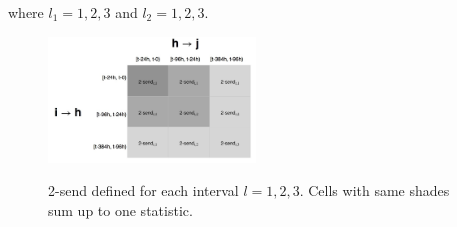 \documentclass{article}
\begin{document}
 where $l_1=1,2,3$ and $l_2=1,2,3$. 
 \begin{figure}[ht]
 	\centering
 	\includegraphics[width=0.49\textwidth]{plots/triadtable.jpg} 
 	\label{fig:triadtable}
 	\caption{2-send defined for each interval $l=1,2,3$. Cells with same shades sum up to one statistic.}
 \end{figure}
 



\end{document}
